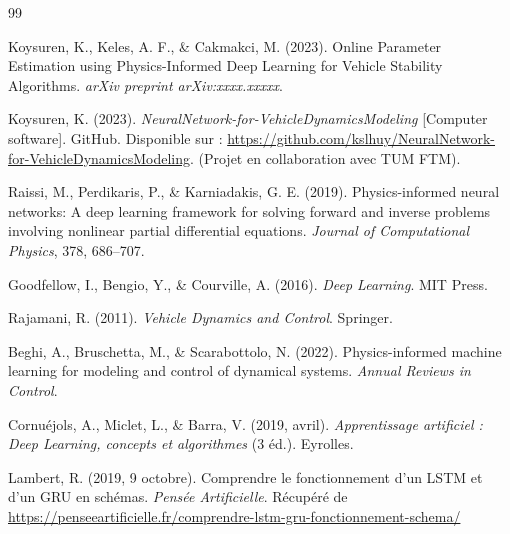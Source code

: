 \documentclass[12pt, a4paper]{report}
\begin{document}
\begin{thebibliography}{99}

Koysuren, K., Keles, A. F., \& Cakmakci, M. (2023). 
Online Parameter Estimation using Physics-Informed Deep Learning for Vehicle Stability Algorithms. 
\textit{arXiv preprint arXiv:xxxx.xxxxx}.

Koysuren, K. (2023). 
\textit{NeuralNetwork-for-VehicleDynamicsModeling} [Computer software]. GitHub. 
Disponible sur : \url{https://github.com/kslhuy/NeuralNetwork-for-VehicleDynamicsModeling}.  
(Projet en collaboration avec TUM FTM).

Raissi, M., Perdikaris, P., \& Karniadakis, G. E. (2019). 
Physics-informed neural networks: A deep learning framework for solving forward and inverse problems involving nonlinear partial differential equations. 
\textit{Journal of Computational Physics}, 378, 686--707.

Goodfellow, I., Bengio, Y., \& Courville, A. (2016). 
\textit{Deep Learning}. MIT Press.

Rajamani, R. (2011). 
\textit{Vehicle Dynamics and Control}. Springer.

Beghi, A., Bruschetta, M., \& Scarabottolo, N. (2022). 
Physics-informed machine learning for modeling and control of dynamical systems. 
\textit{Annual Reviews in Control}.

Cornuéjols, A., Miclet, L., \& Barra, V. (2019, avril). 
\textit{Apprentissage artificiel : Deep Learning, concepts et algorithmes} (3 éd.). Eyrolles.

Lambert, R. (2019, 9 octobre). 
Comprendre le fonctionnement d’un LSTM et d’un GRU en schémas. \textit{Pensée Artificielle}.  
Récupéré de \url{https://penseeartificielle.fr/comprendre-lstm-gru-fonctionnement-schema/}

\end{thebibliography}
\end{document}
